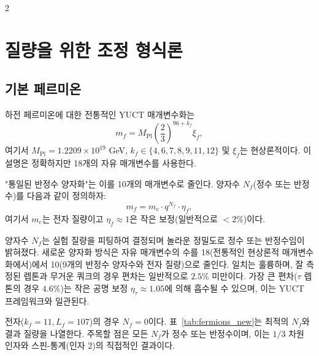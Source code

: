 \documentclass[11pt,a4paper]{article}
\begin{document}
\begin{multicols}{2}
		\section{질량을 위한 조정 형식론}
		\label{sec:formalism}
		
		\subsection{기본 페르미온}
		
		하전 페르미온에 대한 전통적인 YUCT 매개변수화는
		\begin{equation}
			m_f = M_{\mathrm{Pl}} \left( \frac{2}{3} \right)^{96 + k_f} \xi_f,
			\label{eq:mass_fermion}
		\end{equation}
		여기서 \(M_{\mathrm{Pl}} = 1.2209\times 10^{19}\) GeV, \(k_f \in \{4,6,7,8,9,11,12\}\) 및 \(\xi_f\)는 현상론적이다. 이 설명은 정확하지만 18개의 자유 매개변수를 사용한다.
		
		"통일된 반정수 양자화"는 이를 10개의 매개변수로 줄인다. 양자수 \(N_f\)(정수 또는 반정수)를 다음과 같이 정의하자:
		\begin{equation}
			m_f = m_e \cdot q^{N_f} \cdot \eta_f,
			\label{eq:mass_quantized}
		\end{equation}
		여기서 \(m_e\)는 전자 질량이고 \(\eta_f \approx 1\)은 작은 보정(일반적으로 \(<2\%\))이다.
		
		양자수 \(N_f\)는 실험 질량을 피팅하여 결정되며 놀라운 정밀도로 정수 또는 반정수임이 밝혀졌다. 새로운 양자화 방식은 자유 매개변수의 수를 18(전통적인 현상론적 매개변수화에서)에서 10(9개의 반정수 양자수와 전자 질량)으로 줄인다. 일치는 훌륭하며, 잘 측정된 렙톤과 무거운 쿼크의 경우 편차는 일반적으로 \(2.5\%\) 미만이다. 가장 큰 편차(\(\tau\) 렙톤의 경우 \(4.6\%\))는 작은 공명 보정 \(\eta_\tau \approx 1.05\)에 의해 흡수될 수 있으며, 이는 YUCT 프레임워크와 일관된다.
		
		전자(\(k_f=11, L_f=107\))의 경우 \(N_f=0\)이다. 표~\ref{tab:fermions_new}는 최적의 \(N_f\)와 결과 질량을 나열한다. 주목할 점은 모든 \(N_f\)가 정수 또는 반정수이며, 이는 \(1/3\) 차원 인자와 스핀-통계(인자 2)의 직접적인 결과이다.
		

\end{multicols}
\end{document}
